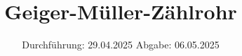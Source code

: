 

\subject{v703}
\title{Geiger-Müller-Zählrohr}
\date{%
  Durchführung: 29.04.2025
  \hspace{3em}
  Abgabe: 06.05.2025
}



\maketitle
\thispagestyle{empty}
\tableofcontents
\newpage






\printbibliography{}


